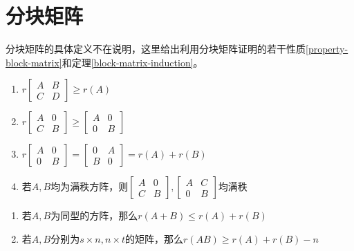 \section{分块矩阵}

分块矩阵的具体定义不在说明，这里给出利用分块矩阵证明的若干性质\ref{property-block-matrix}和定理\ref{block-matrix-induction}。

\begin{property}
    \label{property-block-matrix}
    \begin{enumerate}
        \item $r\begin{bmatrix}
            A & B \\ C & D
        \end{bmatrix}\geqslant r(A)$
        \item $r\begin{bmatrix}
            A&0\\C&B
        \end{bmatrix}\geqslant\begin{bmatrix}
            A&0\\0&B
        \end{bmatrix}$
        \item $r\begin{bmatrix}
            A&0\\0&B
        \end{bmatrix}=\begin{bmatrix}
            0&A\\B&0
        \end{bmatrix}=r(A)+r(B)$
        \item 若$A,B$均为满秩方阵，则$\begin{bmatrix}
            A&0\\C&B
        \end{bmatrix},\begin{bmatrix}
            A&C\\0&B
        \end{bmatrix}$均满秩
    \end{enumerate}
\end{property}

\begin{thm}
    \label{block-matrix-induction}
    \begin{enumerate}
        \item 若$A,B$为同型的方阵，那么$r(A+B)\leqslant r(A)+r(B)$
        \item 若$A,B$分别为$s\times n,n\times t$的矩阵，那么$r(AB)\geqslant r(A)+r(B)-n$
    \end{enumerate}
\end{thm}

